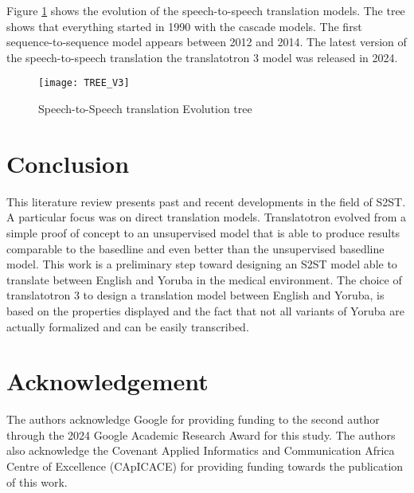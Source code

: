 \documentclass[12pt]{article}
\begin{document}
Figure \ref{tree} shows the evolution of the speech-to-speech translation models. The tree shows that everything started in 1990 with the cascade models. The first sequence-to-sequence model appears between 2012 and 2014. The latest version of the speech-to-speech translation the translatotron 3 model was released in 2024.



\begin{figure}[H]
    \centering
    \texttt{[image: TREE\_V3]} 
    \caption{Speech-to-Speech translation Evolution tree}
    \label{tree}
\end{figure}

\section*{Conclusion}

This literature review presents past and recent developments in the field of S2ST. A particular focus was on direct translation models. Translatotron evolved from a simple proof of concept to an unsupervised model that is able to produce results comparable to the basedline and even better than the unsupervised basedline model. This work is a preliminary step toward designing an S2ST model able to translate between English and Yoruba in the medical environment. The choice of translatotron 3 to design a translation model between English and Yoruba, is based on the properties displayed and the fact that not all variants of Yoruba are actually formalized and can be easily transcribed.



\section*{Acknowledgement}

The authors acknowledge Google for providing funding to the second author through the 2024 Google Academic Research Award for this study. The authors also acknowledge the Covenant Applied Informatics and Communication Africa Centre of Excellence (CApICACE) for providing funding towards the publication of this work.
\end{document}

